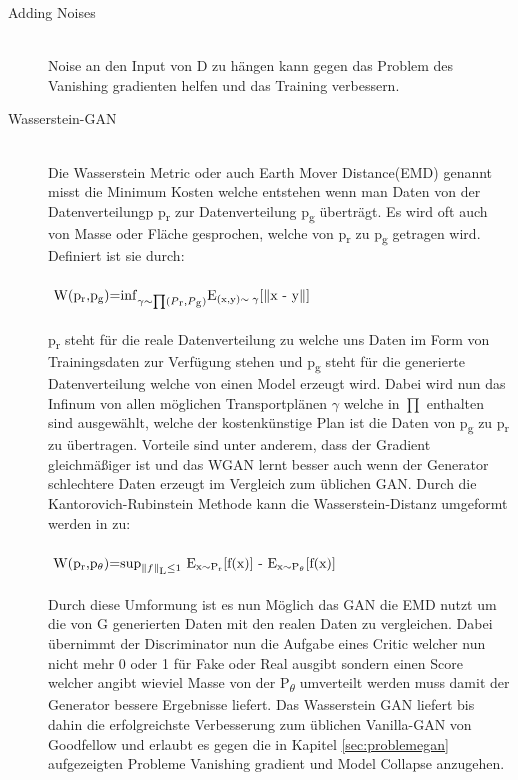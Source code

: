 \documentclass{llncs}
\begin{document}
\begin{description}
\item[Adding Noises]
~\\
Noise an den Input von D zu hängen kann gegen das Problem des Vanishing gradienten helfen und das Training verbessern\cite{improvingan}.\\

\item[Wasserstein-GAN]
~\\
Die Wasserstein Metric oder auch Earth Mover Distance(EMD) genannt misst die Minimum Kosten welche entstehen wenn man Daten von der Datenverteilungp p\textsubscript{r} zur Datenverteilung p\textsubscript{g} überträgt. Es wird oft auch von Masse oder Fläche gesprochen, welche von p\textsubscript{r} zu p\textsubscript{g} getragen wird. Definiert ist sie durch:
\\\\
\begin{math} 
$
W(p\textsubscript{r},p\textsubscript{g})=$\inf_{\gamma\sim\prod(P\textsubscript{r},P\textsubscript{g})}$E\textsubscript{(x,y)$\sim\gamma$}[$\parallel$x - y$\parallel$]
$
\end{math}
\\\\
p\textsubscript{r} steht für die reale Datenverteilung zu welche uns Daten im Form von Trainingsdaten zur Verfügung stehen und p\textsubscript{g} steht für die generierte Datenverteilung welche von einen Model erzeugt wird. Dabei wird nun das Infinum von allen möglichen Transportplänen $\gamma$ welche in $\prod$ enthalten sind ausgewählt, welche der kostenkünstige Plan ist die Daten von p\textsubscript{g} zu p\textsubscript{r} zu übertragen. Vorteile sind unter anderem, dass der Gradient gleichmäßiger ist und das WGAN lernt besser auch wenn der Generator schlechtere Daten erzeugt im Vergleich zum üblichen GAN\cite{wasserstein}. Durch die Kantorovich-Rubinstein Methode kann die Wasserstein-Distanz umgeformt werden in zu:
\\\\
\begin{math} 
$
W(p\textsubscript{r},p\textsubscript{$\theta$})=$\sup_{\parallel f \parallel \textsubscript{L}\leq 1}$ E\textsubscript{x$\sim$P\textsubscript{r}}[f(x)] - E\textsubscript{x$\sim$P\textsubscript{$\theta$}}[f(x)]
$
\end{math}
\\\\
Durch diese Umformung ist es nun Möglich das GAN die EMD nutzt um die von G generierten Daten mit den realen Daten zu vergleichen. Dabei übernimmt der Discriminator nun die Aufgabe eines Critic welcher nun nicht mehr 0 oder 1 für Fake oder Real ausgibt sondern einen Score welcher angibt wieviel Masse von der P\textsubscript{$\theta$} umverteilt werden muss damit der Generator bessere Ergebnisse liefert. Das Wasserstein GAN liefert bis dahin die erfolgreichste Verbesserung zum üblichen Vanilla-GAN von Goodfellow und erlaubt es gegen die in Kapitel \ref{sec:problemegan} aufgezeigten Probleme Vanishing gradient und Model Collapse anzugehen\cite{wasserstein}. 
\end{description}
\newpage
\end{document}
